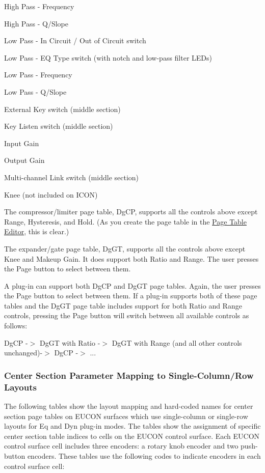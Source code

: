 \begin{DoxyItemize}
\begin{DoxyEnumerate}
\item High Pass -\/ Frequency  
\item High Pass -\/ Q/\+Slope  
\item Low Pass -\/ In Circuit / Out of Circuit switch  
\item Low Pass -\/ E\+Q Type switch (with notch and low-\/pass filter L\+E\+Ds) 
\item Low Pass -\/ Frequency  
\item Low Pass -\/ Q/\+Slope  
\item External Key switch (middle section)  
\item Key Listen switch (middle section)  
\item Input Gain  
\item Output Gain  
\item Multi-\/channel Link switch (middle section)  
\item Knee (not included on I\+C\+O\+N)  
\end{DoxyEnumerate}
\end{DoxyItemize}

The compressor/limiter page table, Dg\+C\+P, supports all the controls above except Range, Hysteresis, and Hold. (As you create the page table in the \hyperlink{a00363_subsection_creating_page_tables_in_pete}{Page Table Editor}, this is clear.)

The expander/gate page table, Dg\+G\+T, supports all the controls above except Knee and Makeup Gain. It does support both Ratio and Range. The user presses the Page button to select between them.

A plug-\/in can support both Dg\+C\+P and Dg\+G\+T page tables. Again, the user presses the Page button to select between them. If a plug-\/in supports both of these page tables and the Dg\+G\+T page table includes support for both Ratio and Range controls, pressing the Page button will switch between all available controls as follows\+:

Dg\+C\+P -\/$>$ Dg\+G\+T with Ratio -\/$>$ Dg\+G\+T with Range (and all other controls unchanged)-\/$>$ Dg\+C\+P -\/$>$ ...

\hypertarget{a00363_aax_page_table_guide_04_avid_center_section_page_tables_eucon_mapping}{}\subsubsection{Center Section Parameter Mapping to Single-\/\+Column/\+Row Layouts}\label{a00363_aax_page_table_guide_04_avid_center_section_page_tables_eucon_mapping}
 The following tables show the layout mapping and hard-\/coded names for center section page tables on E\+U\+C\+O\+N surfaces which use single-\/column or single-\/row layouts for Eq and Dyn plug-\/in modes. The tables show the assignment of specific center section table indices to cells on the E\+U\+C\+O\+N control surface. Each E\+U\+C\+O\+N control surface cell includes three encoders\+: a rotary knob encoder and two push-\/button encoders. These tables use the following codes to indicate encoders in each control surface cell\+:


